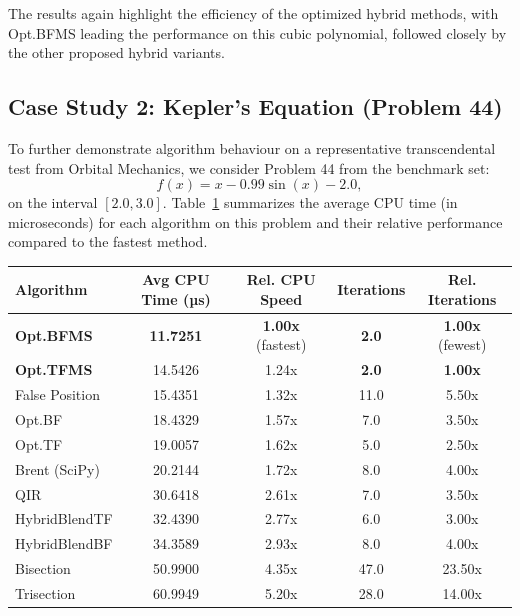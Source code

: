 \documentclass[amsmath, amssymb, aps]{revtex4-2}
\begin{document}
The results again highlight the efficiency of the optimized hybrid methods, with Opt.BFMS leading the performance on this cubic polynomial, followed closely by the other proposed hybrid variants. 

\subsection*{Case Study 2: Kepler's Equation (Problem 44)}
To further demonstrate algorithm behaviour on a representative transcendental test from Orbital Mechanics, we consider Problem 44 from the benchmark set:
\[
f(x) = x - 0.99 \sin(x) - 2.0,
\]
on the interval $[2.0, 3.0]$. Table~\ref{tab:realworld2} summarizes the average CPU time (in microseconds) for each algorithm on this problem and their relative performance compared to the fastest method.

\begin{table}[H]
\centering
{}
\label{tab:realworld2}
\begin{tabular}{lcccc}
\hline
Algorithm              & Avg CPU Time (µs) & Rel. CPU Speed         & Iterations & Rel. Iterations        \\
\hline
\textbf{Opt.BFMS}      & \textbf{11.7251}  & \textbf{1.00x} (fastest)     & \textbf{2.0}  & \textbf{1.00x} (fewest) \\
\textbf{Opt.TFMS}      & 14.5426           & 1.24x                        & \textbf{2.0}  & \textbf{1.00x}          \\
False Position         & 15.4351           & 1.32x                        & 11.0          & 5.50x                   \\
Opt.BF                 & 18.4329           & 1.57x                        & 7.0           & 3.50x                   \\
Opt.TF                 & 19.0057           & 1.62x                        & 5.0           & 2.50x                   \\
Brent (SciPy)          & 20.2144           & 1.72x                        & 8.0           & 4.00x                   \\
QIR                    & 30.6418           & 2.61x                        & 7.0           & 3.50x                   \\
HybridBlendTF          & 32.4390           & 2.77x                        & 6.0           & 3.00x                   \\
HybridBlendBF          & 34.3589           & 2.93x                        & 8.0           & 4.00x                   \\
Bisection              & 50.9900           & 4.35x                        & 47.0          & 23.50x                  \\
Trisection             & 60.9949           & 5.20x                        & 28.0          & 14.00x                  \\
\hline
\end{tabular}
\end{table}
\end{document}
